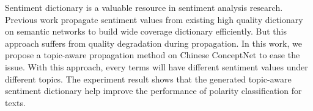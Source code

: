 Sentiment dictionary is a valuable resource in sentiment analysis research. Previous work propagate sentiment values from existing high quality dictionary on semantic networks to build wide coverage dictionary efficiently. But this approach suffers from quality degradation during propagation. In this work, we propose a topic-aware propagation method on Chinese ConceptNet to ease the issue. With this approach, every terms will have different sentiment values under different topics. The experiment result shows that the generated topic-aware sentiment dictionary help improve the performance of polarity classification for texts.




